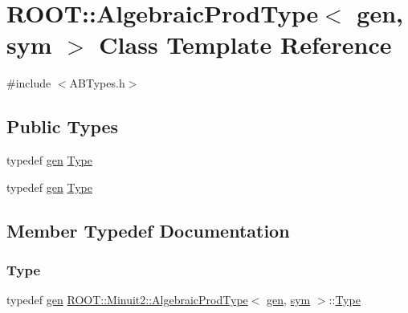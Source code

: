 \hypertarget{classROOT_1_1Minuit2_1_1AlgebraicProdType_3_01gen_00_01sym_01_4}{}\section{R\+O\+OT\+:\+:Algebraic\+Prod\+Type$<$ gen, sym $>$ Class Template Reference}
\label{classROOT_1_1Minuit2_1_1AlgebraicProdType_3_01gen_00_01sym_01_4}


{\ttfamily \#include $<$A\+B\+Types.\+h$>$}

\subsection*{Public Types}
\begin{DoxyCompactItemize}
\item 
typedef \mbox{\hyperlink{classROOT_1_1Minuit2_1_1gen}{gen}} \mbox{\hyperlink{classROOT_1_1Minuit2_1_1AlgebraicProdType_3_01gen_00_01sym_01_4_acdbf9062d11987f3a1cb857a95ef2669}{Type}}
\item 
typedef \mbox{\hyperlink{classROOT_1_1Minuit2_1_1gen}{gen}} \mbox{\hyperlink{classROOT_1_1Minuit2_1_1AlgebraicProdType_3_01gen_00_01sym_01_4_acdbf9062d11987f3a1cb857a95ef2669}{Type}}
\end{DoxyCompactItemize}


\subsection{Member Typedef Documentation}
\mbox{\label{classROOT_1_1Minuit2_1_1AlgebraicProdType_3_01gen_00_01sym_01_4_acdbf9062d11987f3a1cb857a95ef2669}} 
\subsubsection{\texorpdfstring{Type}{Type}\hspace{0.1cm}{\footnotesize\ttfamily [1/2]}}
{\footnotesize\ttfamily typedef \mbox{\hyperlink{classROOT_1_1Minuit2_1_1gen}{gen}} \mbox{\hyperlink{classROOT_1_1Minuit2_1_1AlgebraicProdType}{R\+O\+O\+T\+::\+Minuit2\+::\+Algebraic\+Prod\+Type}}$<$ \mbox{\hyperlink{classROOT_1_1Minuit2_1_1gen}{gen}}, \mbox{\hyperlink{classROOT_1_1Minuit2_1_1sym}{sym}} $>$\+::\mbox{\hyperlink{classROOT_1_1Minuit2_1_1AlgebraicProdType_3_01gen_00_01sym_01_4_acdbf9062d11987f3a1cb857a95ef2669}{Type}}}

